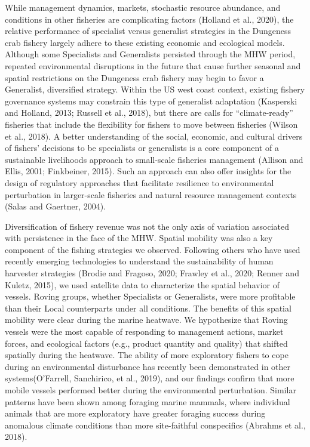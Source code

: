 \documentclass[]{elsarticle} %
\begin{document}
While management dynamics, markets, stochastic resource abundance, and
conditions in other fisheries are complicating factors (Holland et al.,
2020), the relative performance of specialist versus generalist
strategies in the Dungeness crab fishery largely adhere to these
existing economic and ecological models. Although some Specialists and
Generalists persisted through the MHW period, repeated environmental
disruptions in the future that cause further seasonal and spatial
restrictions on the Dungeness crab fishery may begin to favor a
Generalist, diversified strategy. Within the US west coast context,
existing fishery governance systems may constrain this type of
generalist adaptation (Kasperski and Holland, 2013; Russell et al.,
2018), but there are calls for ``climate-ready'' fisheries that include
the flexibility for fishers to move between fisheries (Wilson et al.,
2018). A better understanding of the social, economic, and cultural
drivers of fishers' decisions to be specialists or generalists is a core
component of a sustainable livelihoods approach to small-scale fisheries
management (Allison and Ellis, 2001; Finkbeiner, 2015). Such an approach
can also offer insights for the design of regulatory approaches that
facilitate resilience to environmental perturbation in larger-scale
fisheries and natural resource management contexts (Salas and Gaertner,
2004).

Diversification of fishery revenue was not the only axis of variation
associated with persistence in the face of the MHW. Spatial mobility was
also a key component of the fishing strategies we observed. Following
others who have used recently emerging technologies to understand the
sustainability of human harvester strategies (Brodie and Fragoso, 2020;
Frawley et al., 2020; Renner and Kuletz, 2015), we used satellite data
to characterize the spatial behavior of vessels. Roving groups, whether
Specialists or Generalists, were more profitable than their Local
counterparts under all conditions. The benefits of this spatial mobility
were clear during the marine heatwave. We hypothesize that Roving
vessels were the most capable of responding to management actions,
market forces, and ecological factors (e.g., product quantity and
quality) that shifted spatially during the heatwave. The ability of more
exploratory fishers to cope during an environmental disturbance has
recently been demonstrated in other systems(O'Farrell, Sanchirico, et
al., 2019), and our findings confirm that more mobile vessels performed
better during the environmental perturbation. Similar patterns have been
shown among foraging marine mammals, where individual animals that are
more exploratory have greater foraging success during anomalous climate
conditions than more site-faithful conspecifics (Abrahms et al., 2018).
\end{document}
